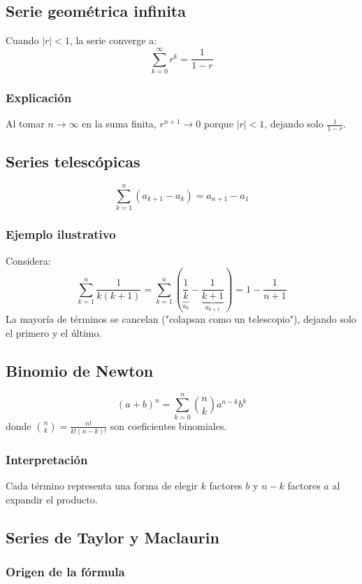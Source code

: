 \documentclass[letterpaper, 12pt]{article}
\begin{document}
	\subsection{Serie geométrica infinita}
	
	Cuando $|r| < 1$, la serie converge a:
	\[
	\sum_{k=0}^\infty r^k = \frac{1}{1 - r}
	\]
	
	\subsubsection{Explicación}
	Al tomar $n \to \infty$ en la suma finita, $r^{n+1} \to 0$ porque $|r| < 1$, dejando solo $\frac{1}{1-r}$.
	
	\subsection{Series telescópicas}
	
	\[
	\sum_{k=1}^n (a_{k+1} - a_k) = a_{n+1} - a_1
	\]
	
	\subsubsection{Ejemplo ilustrativo}
	Considera:
	\[
	\sum_{k=1}^n \frac{1}{k(k+1)} = \sum_{k=1}^n \left( \underbrace{\frac{1}{k}}_{a_k} - \underbrace{\frac{1}{k+1}}_{a_{k+1}} \right) = 1 - \frac{1}{n+1}
	\]
	La mayoría de términos se cancelan ("colapsan como un telescopio"), dejando solo el primero y el último.
	
	\subsection{Binomio de Newton}
	
	\[
	(a + b)^n = \sum_{k=0}^n \binom{n}{k} a^{n-k}b^k
	\]
	donde $\binom{n}{k} = \frac{n!}{k!(n-k)!}$ son coeficientes binomiales.
	
	\subsubsection{Interpretación}
	Cada término representa una forma de elegir $k$ factores $b$ y $n-k$ factores $a$ al expandir el producto.
	
	\subsection{Series de Taylor y Maclaurin}
	
	\subsubsection{Origen de la fórmula}
	
\end{document}

